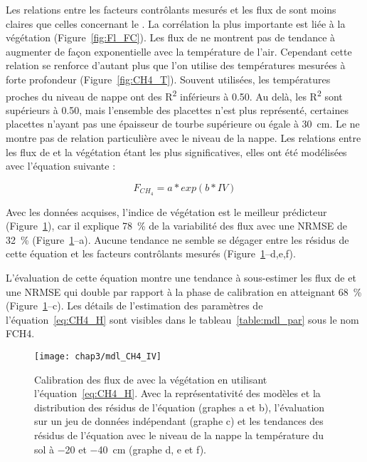 Les relations entre les facteurs contrôlants mesurés et les flux de \chh sont moins claires que celles concernant le \coo.
La corrélation la plus importante est liée à la végétation (Figure~\ref{fig:Fl_FC}).
Les flux de \chh ne montrent pas de tendance à augmenter de façon exponentielle avec la température de l'air.
Cependant cette relation se renforce d'autant plus que l'on utilise des températures mesurées à forte profondeur (Figure~\ref{fig:CH4_T}).
Souvent utilisées, les températures proches du niveau de nappe ont des R\textsuperscript{2} inférieurs à \num{0.50}.
Au delà, les R\textsuperscript{2} sont supérieurs à \num{0.50}, mais l'ensemble des placettes n'est plus représenté, certaines placettes n'ayant pas une épaisseur de tourbe supérieure ou égale à \SI{30}{\centi\metre}.
Le \chh ne montre pas de relation particulière avec le niveau de la nappe.
Les relations entre les flux de \chh et la végétation étant les plus significatives, elles ont été modélisées avec l'équation suivante :

\begin{equation} \label{eq:CH4_H}
F_{CH_{4}} = a*exp(b*IV)
\end{equation}

Avec les données acquises, l'indice de végétation est le meilleur prédicteur (Figure~\ref{fig:CH4_mdl}), car il explique \SI{78}{\percent} de la variabilité des flux \chh avec une NRMSE de \SI{32}{\percent} (Figure~\ref{fig:CH4_mdl}--a).
Aucune tendance ne semble se dégager entre les résidus de cette équation et les facteurs contrôlants mesurés (Figure~\ref{fig:CH4_mdl}--d,e,f).

L'évaluation de cette équation montre une tendance à sous-estimer les flux de \chh et une NRMSE qui double par rapport à la phase de calibration en atteignant \SI{68}{\percent} (Figure~\ref{fig:CH4_mdl}--c).
Les détails de l'estimation des paramètres de l'équation~\ref{eq:CH4_H} sont visibles dans le tableau~\ref{table:mdl_par} sous le nom FCH4.

\begin{figure}
\centering
\texttt{[image: chap3/mdl\_CH4\_IV]}
\caption{Calibration des flux de \chh avec la végétation en utilisant l'équation~\ref{eq:CH4_H}. Avec la représentativité des modèles et la distribution des résidus de l'équation (graphes a et b), l'évaluation sur un jeu de données indépendant (graphe c) et les tendances des résidus de l'équation avec le niveau de la nappe la température du sol à \num{-20} et \SI{-40}{\centi\metre} (graphe d, e et f).}
\label{fig:CH4_mdl}
\end{figure}





